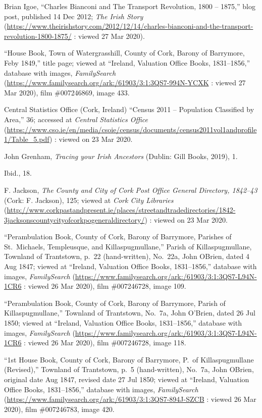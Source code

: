 \begin{thebibliography}{999}
Brian Igoe, ``Charles Bianconi and The Transport Revolution, 1800 -- 1875,'' blog post, published 14 Dec 2012; \textit{The Irish Story} (\url{https://www.theirishstory.com/2012/12/14/charles-bianconi-and-the-transport-revolution-1800-1875/} : viewed 27 Mar 2020).

``House Book, Town of Watergrasshill, County of Cork, Barony of Barrymore, Feby 1849,'' title page; viewed at ``Ireland, Valuation Office Books, 1831--1856,'' database with images, \textit{FamilySearch} (\url{https://www.familysearch.org/ark:/61903/3:1:3QS7-994N-YCXK} : viewed 27 Mar 2020), film \#007246869, image 433.

Central Statistics Office (Cork, Ireland) ``Census 2011 -- Population Classified by Area,'' 36; accessed at \textit{Central Statistics Office} (\url{https://www.cso.ie/en/media/csoie/census/documents/census2011vol1andprofile1/Table_5.pdf}) : viewed on 23 Mar 2020.

John Grenham, \textit{Tracing your Irish Ancestors} (Dublin: Gill Books, 2019), 1.

Ibid., 18.

F. Jackson, \textit{The County and City of Cork Post Office General Directory, 1842--43} (Cork: F. Jackson), 125; viewed at \textit{Cork City Libraries} (\url{http://www.corkpastandpresent.ie/places/streetandtradedirectories/1842-3jacksonscountycityofcorkpogeneraldirectory/}) : viewed on 23 Mar 2020.

``Perambulation Book, County of Cork, Barony of Barrymore, Parishes of St.\ Michaels, Templeusque, and Killaspugmullane,'' Parish of Killaspugmullane, Townland of Trantstown, p.\ 22 (hand-written), No.\ 22a, John OBrien, dated 4 Aug 1847; viewed at ``Ireland, Valuation Office Books, 1831--1856,'' database with images, \textit{FamilySearch} (\url{https://www.familysearch.org/ark:/61903/3:1:3QS7-L94N-1CR6} : viewed 26 Mar 2020), film \#007246728, image 109.

``Perambulation Book, County of Cork, Barony of Barrymore, Parish of Killaspugmullane,'' Townland of Trantstown, No.\ 7a, John O'Brien, dated 26 Jul 1850; viewed at ``Ireland, Valuation Office Books, 1831--1856,'' database with images, \textit{FamilySearch} (\url{https://www.familysearch.org/ark:/61903/3:1:3QS7-L94N-1CR6} : viewed 26 Mar 2020), film \#007246728, image 118.

``1st House Book, County of Cork, Barony of Barrymore, P.\ of Killaspugmullane (Revised),'' Townland of Trantstown, p.\ 5 (hand-written), No.\ 7a, John OBrien, original date Aug 1847, revised date 27 Jul 1850; viewed at ``Ireland, Valuation Office Books, 1831--1856,'' database with images, \textit{FamilySearch} (\url{https://www.familysearch.org/ark:/61903/3:1:3QS7-894J-SZCB} : viewed 26 Mar 2020), film \#007246783, image 420.


\end{thebibliography}
